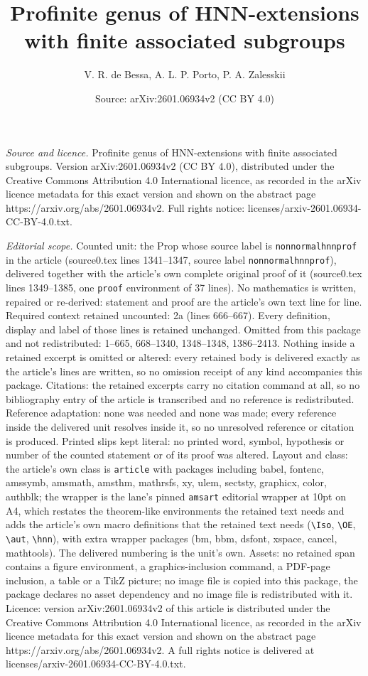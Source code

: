 \documentclass[10pt,a4paper]{amsart}
\title[Profinite genus of HNN-extensions with finite associated sub]{Profinite genus of HNN-extensions with finite associated subgroups}
\author{V. R. de Bessa, A. L. P. Porto, P. A. Zalesskii}
\date{Source: arXiv:2601.06934v2 (CC BY 4.0)}
\begin{document}
\maketitle

\noindent\emph{Source and licence.} Profinite genus of HNN-extensions with finite associated subgroups. Version arXiv:2601.06934v2 (CC BY 4.0), distributed under the Creative Commons Attribution 4.0 International licence, as recorded in the arXiv licence metadata for this exact version and shown on the abstract page https://arxiv.org/abs/2601.06934v2. Full rights notice: licenses/arxiv-2601.06934-CC-BY-4.0.txt.\par\smallskip

\noindent\textit{Editorial scope.} Counted unit: the Prop whose source label is \texttt{nonnormalhnnprof} in the article (source0.tex lines 1341--1347, source label \texttt{nonnormalhnnprof}), delivered together with the article's own complete original proof of it (source0.tex lines 1349--1385, one \texttt{proof} environment of 37 lines). No mathematics is written, repaired or re-derived: statement and proof are the article's own text line for line. Required context retained uncounted: 2a (lines 666--667). Every definition, display and label of those lines is retained unchanged. Omitted from this package and not redistributed: 1--665, 668--1340, 1348--1348, 1386--2413. Nothing inside a retained excerpt is omitted or altered: every retained body is delivered exactly as the article's lines are written, so no omission receipt of any kind accompanies this package. Citations: the retained excerpts carry no citation command at all, so no bibliography entry of the article is transcribed and no reference is redistributed. Reference adaptation: none was needed and none was made; every reference inside the delivered unit resolves inside it, so no unresolved reference or citation is produced. Printed slips kept literal: no printed word, symbol, hypothesis or number of the counted statement or of its proof was altered. Layout and class: the article's own class is \texttt{article} with packages including babel, fontenc, amssymb, amsmath, amsthm, mathrsfs, xy, ulem, sectsty, graphicx, color, authblk; the wrapper is the lane's pinned \texttt{amsart} editorial wrapper at 10pt on A4, which restates the theorem-like environments the retained text needs and adds the article's own macro definitions that the retained text needs (\texttt{\textbackslash Iso}, \texttt{\textbackslash OE}, \texttt{\textbackslash aut}, \texttt{\textbackslash hnn}), with extra wrapper packages (bm, bbm, dsfont, xspace, cancel, mathtools). The delivered numbering is the unit's own. Assets: no retained span contains a figure environment, a graphics-inclusion command, a PDF-page inclusion, a table or a TikZ picture; no image file is copied into this package, the package declares no asset dependency and no image file is redistributed with it. Licence: version arXiv:2601.06934v2 of this article is distributed under the Creative Commons Attribution 4.0 International licence, as recorded in the arXiv licence metadata for this exact version and shown on the abstract page https://arxiv.org/abs/2601.06934v2. A full rights notice is delivered at licenses/arxiv-2601.06934-CC-BY-4.0.txt. 
\end{document}
